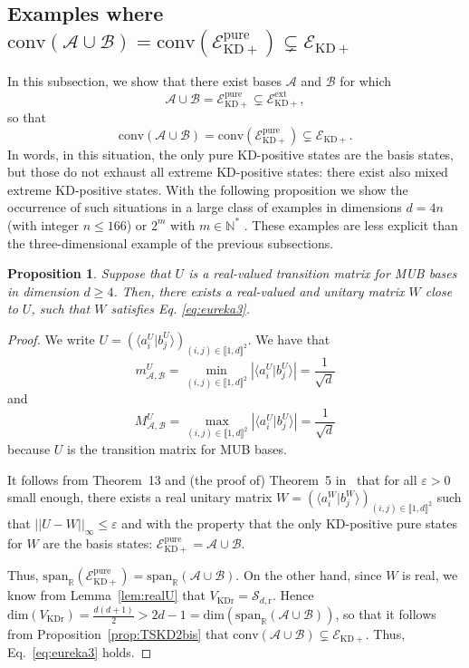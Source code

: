 \documentclass[a4paper, notitlepage, 11pt]{article}
\numberwithin{equation}{section}
\newcommand{\bracket}[2]{\langle #1|#2\rangle}
\newcommand{\norme}[2]{\left|\left|#1\right|\right|_{#2}}
\newcommand{\Acal}{{\mathcal A}}
\newcommand{\Bcal}{{\mathcal B}}
\newcommand{\EcalKDC}{{\mathcal E}_{\mathrm{KD+}}}
\newcommand{\EcalKDCpu}{{\mathcal E}_{\mathrm{KD+}}^{\mathrm{pure}}}
\newcommand{\EcalKDCext}{{\mathcal E}_{\mathrm{KD+}}^{\mathrm{ext}}}
\newcommand{\spanRAB}{{\mathrm{span}_{\R}(\Acal\cup\Bcal)}}
\newcommand{\N}{\mathbb{N}}
\newcommand{\R}{\mathbb{R}}
\newcommand{\mab}{m_{\Acal,\Bcal}}
\newcommand{\conv}[1]{\mathrm{conv}\left(#1\right)}
\newcommand{\VR}{V_{\mathrm{KDr}}}
\newcommand{\SAOr}{\mathcal{S}_{d,\mathrm r}}
\newcommand{\IntEnt}[2]{\llbracket #1 , #2 \rrbracket}
\newcommand{\convAB}{\conv{\Acal \cup \Bcal}}
\renewcommand{\epsilon}{\varepsilon}
\newtheorem{Prop}[Theorem]{Proposition}
\begin{document}
\subsection{Examples where $\convAB = \conv{\EcalKDCpu}\subsetneq \EcalKDC$}\label{s:mixedextremed=4n}
In this subsection, we show that there exist bases $\Acal$ and $\Bcal$ for which
\begin{equation}\label{eq:eureka3}
\Acal\cup\Bcal= \EcalKDCpu\subsetneq \EcalKDCext,
\end{equation}
so that 
\begin{equation}
\convAB = \conv{\EcalKDCpu}\subsetneq \EcalKDC.
\end{equation}
In  words, in this situation, the only pure KD-positive  states are the basis states, but those do not exhaust all extreme KD-positive  states: there   exist also mixed extreme KD-positive  states.  With the following proposition we show the occurrence of such situations in a large class of examples in dimensions $d=4n$ (with integer $n\leq166$) or $2^m$ with $m\in\N^*$ \cite{boykinetal2005,Ba22}. These examples are  less explicit than the three-dimensional example of the previous subsections.
\begin{Prop}
    Suppose that $U$ is a real-valued transition matrix for MUB bases in dimension $d\geqslant 4$. Then, there exists a real-valued and unitary matrix $W$ close to $U$, such that $W$ satisfies Eq. \eqref{eq:eureka3}.
\end{Prop}

\begin{proof}
We write $U=(\bracket{a_i^{U}}{b_j^{U}})_{(i,j)\in\IntEnt{1}{d}^2}$. We have that 
$$
\mab^{U} = \min_{(i,j)\in\IntEnt{1}{d}^2} \left|\bracket{a_i^{U}}{b_{j}^{U}}\right| = \frac{1}{\sqrt{d}}
$$ and 
$$
M_{\Acal,\Bcal}^{U} = \max_{(i,j)\in\IntEnt{1}{d}^2} \left|\bracket{a_i^{U}}{b_{j}^{U}}\right| = \frac{1}{\sqrt{d}}
$$ because $U$ is the transition matrix for MUB bases.


 It follows from Theorem~13 and (the proof of) Theorem~5 in~\cite{debievre2023a} that for all $\epsilon>0$ small enough, there exists a real unitary matrix $W=(\bracket{a_i^{W}}{b_j^{W}})_{(i,j)\in\IntEnt{1}{d}^2}$ such that $\norme{U-W}{\infty} \leqslant \epsilon$ and with the property that the only KD-positive pure states for $W$ are the basis states: $\EcalKDCpu=\mathcal A\cup \mathcal B$. 

Thus, $\mathrm{span}_{\R}(\EcalKDCpu) = \spanRAB$.  On the other hand, since $W$ is real, we know from Lemma~\ref{lem:realU} that $\VR= \SAOr$. Hence $ \mathrm{dim}(\VR)=\frac{d(d+1)}{2} > 2d-1 = \mathrm{dim}(\spanRAB)$, so that it follows from Proposition~\ref{prop:TSKD2bis} that $\convAB\subsetneq \EcalKDC$. Thus, Eq.~\eqref{eq:eureka3} holds.
\end{proof}
\end{document}
